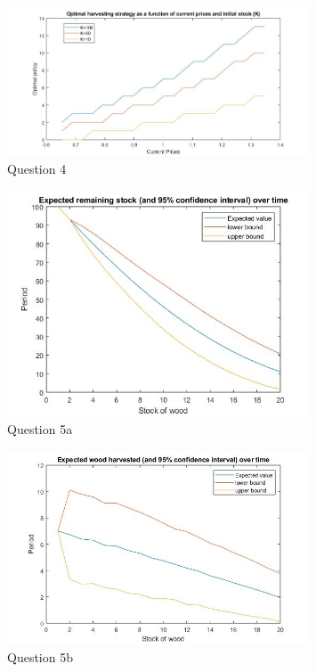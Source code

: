 \documentclass[11pt]{article}
\begin{document}
\begin{figure}[!h]
	\centering
	\includegraphics[width=0.8\textwidth]{Figures/figure2.jpg}
	\caption{Question 4}
\end{figure}

\begin{figure}[!h]
	\centering
	\includegraphics[width=0.8\textwidth]{Figures/figure5.jpg}
	\caption{Question 5a}
\end{figure}

\begin{figure}[!h]
	\centering
	\includegraphics[width=0.8\textwidth]{Figures/figure6.jpg}
	\caption{Question 5b}
\end{figure}
\end{document}
